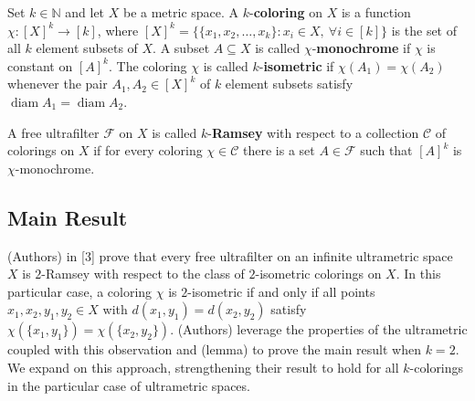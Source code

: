 Set \( k \in \mathbb{N} \) and let \( X \) be a metric space. A \( k \)-\textbf{coloring} on \( X \) is a function \( \chi  : [X]^{k} \to [k] \), where \( [X]^{k} = \{ \{ x_1, x_2, \ldots, x_{k}  \} : x_{i} \in X, \ \forall i \in [k]\}   \) is the set of all \( k \) element subsets of \( X \). A subset \( A \subseteq X \) is called \( \chi \)-\textbf{monochrome} if \( \chi \) is constant on \( [A]^{k}  \). The coloring \( \chi \) is called \( k \)-\textbf{isometric} if \( \chi (A_1) = \chi (A_2)  \) whenever the pair \( A_1, A_2 \in [X]^{k}  \) of \( k \) element subsets satisfy \( \operatorname{diam}A_1 = \operatorname{diam}A_2  \).

A free ultrafilter \( \mathcal{F}  \) on \( X \) is called \( k \)-\textbf{Ramsey} with respect to a collection \( \mathcal{C}  \) of colorings on \( X \) if for every coloring \( \chi \in \mathcal{C}  \) there is a set \( A  \in \mathcal{F}  \) such that \( [A]^{k}  \) is \( \chi \)-monochrome.
\subsection{Main Result}
(Authors) in [3] prove that every free ultrafilter on an infinite ultrametric space \( X \) is \( 2 \)-Ramsey with respect to the class of \( 2 \)-isometric colorings on \( X \). In this particular case, a coloring \( \chi \) is \( 2 \)-isometric if and only if all points \( x_1, x_2, y_1, y_2 \in X \) with \( d(x_1, y_1) = d(x_2, y_2) \) satisfy \( \chi (\{ x_1, y_1 \}) = \chi (\{ x_2, y_2 \} ) \). (Authors) leverage the properties of the ultrametric coupled with this observation and (lemma) to prove the main result when \( k = 2 \). We expand on this approach, strengthening their result to hold for all \( k \)-colorings in the particular case of ultrametric spaces.

